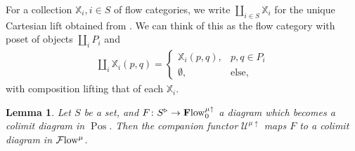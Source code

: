 \documentclass[10pt]{amsart}
\numberwithin{equation}{section}
\newtheorem{lem}[prop]{Lemma}
\theoremstyle{definition}
\DeclareMathOperator{\Pos}{Pos}
\newcommand{\Flow}{\cF\mathrm{low}\vphantom{w}}
\newcommand{\bfPreFlow}{\mathbf{F}\mathrm{low}\vphantom{w}}
\newcommand{\bX}{\mathbb{X}}
\newcommand{\cF}{\mathcal{F}}
\newcommand{\cU}{\mathcal{U}}
\renewcommand{\to}{\mathchoice{\longrightarrow}{\rightarrow}{}{}}
\begin{document}
For a collection $\bX_{i}, i\in S$ of flow categories, we write $\coprod_{i\in S} \bX_{i}$ for the unique Cartesian lift obtained from .
We can think of this as the flow category with poset of objects $\coprod_{i} P_{i}$ and
\begin{align*}
	\coprod_{i} \bX_{i}(p,q) = \begin{cases}
		\bX_{i}(p,q), & p,q\in P_{i} \\
		\emptyset, & \text{else,}
	\end{cases}
\end{align*}
with composition lifting that of each $\bX_{i}$.
\begin{lem}\label{lem:coproducts_in_flow}
	Let $S$ be a set, and $F\colon S^{\triangleright} \to \bfPreFlow^{\mu\uparrow}_{0}$ a diagram which becomes a colimit diagram in $\Pos$. Then the companion functor $\cU^{\mu\uparrow}$ maps $F$ to a colimit diagram in $\Flow^{\mu}$.
\end{lem}
\end{document}
